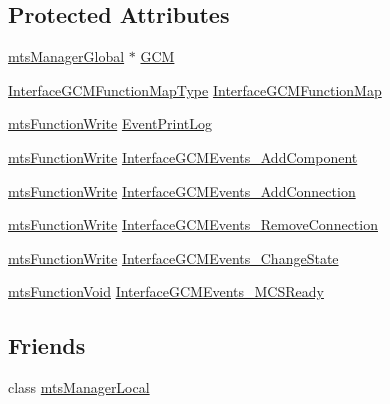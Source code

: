 \subsection*{Protected Attributes}
\begin{DoxyCompactItemize}
\item 
\hyperlink{classmts_manager_global}{mts\+Manager\+Global} $\ast$ \hyperlink{classmts_manager_component_server_a59e64d383adcaa04d1e89e4596864209}{G\+C\+M}
\item 
\hyperlink{classmts_manager_component_server_a9b456473c566d9993274d3de0f124f7c}{Interface\+G\+C\+M\+Function\+Map\+Type} \hyperlink{classmts_manager_component_server_aba31458f9efbd9bd8f3ffc9335f56c9e}{Interface\+G\+C\+M\+Function\+Map}
\item 
\hyperlink{classmts_function_write}{mts\+Function\+Write} \hyperlink{classmts_manager_component_server_a183cc63d73da8ba811bab26d4c7ce2d7}{Event\+Print\+Log}
\item 
\hyperlink{classmts_function_write}{mts\+Function\+Write} \hyperlink{classmts_manager_component_server_a5ba7772f5e8d7da177f8280f61ca8610}{Interface\+G\+C\+M\+Events\+\_\+\+Add\+Component}
\item 
\hyperlink{classmts_function_write}{mts\+Function\+Write} \hyperlink{classmts_manager_component_server_a45cc7ef85a7b47f504cecfe23d40590f}{Interface\+G\+C\+M\+Events\+\_\+\+Add\+Connection}
\item 
\hyperlink{classmts_function_write}{mts\+Function\+Write} \hyperlink{classmts_manager_component_server_a11a899e797a81a3e84bd4bc7c2025344}{Interface\+G\+C\+M\+Events\+\_\+\+Remove\+Connection}
\item 
\hyperlink{classmts_function_write}{mts\+Function\+Write} \hyperlink{classmts_manager_component_server_a169604bf1d8337dc3b4a4d7017d61982}{Interface\+G\+C\+M\+Events\+\_\+\+Change\+State}
\item 
\hyperlink{classmts_function_void}{mts\+Function\+Void} \hyperlink{classmts_manager_component_server_a3c150e5ac5a8a4b7b68d30874e8daf73}{Interface\+G\+C\+M\+Events\+\_\+\+M\+C\+S\+Ready}
\end{DoxyCompactItemize}
\subsection*{Friends}
\begin{DoxyCompactItemize}
\item 
class \hyperlink{classmts_manager_component_server_a31c1c611dbb103ac58ed40d84960baa0}{mts\+Manager\+Local}
\end{DoxyCompactItemize}
